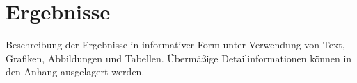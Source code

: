 \chapter{Ergebnisse}\label{ch:3}

Beschreibung der Ergebnisse in informativer Form unter Verwendung von Text, Grafiken, Abbildungen und Tabellen. Übermäßige Detailinformationen können in den Anhang ausgelagert werden.